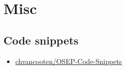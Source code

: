 \chapter{Misc}
\label{links:misc}

\section{Code snippets}

\begin{itemize}
    \item \href{https://github.com/chvancooten/OSEP-Code-Snippets/tree/main}{chvancooten/OSEP-Code-Snippets}
\end{itemize}











